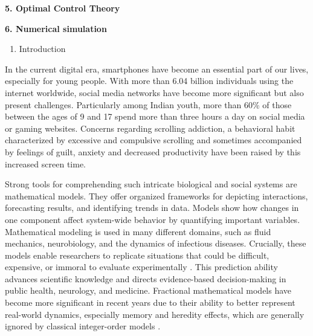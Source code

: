 \documentclass[10pt]{NSP1}
\begin{document}
	\par\medskip\noindent \begin{center}\normalsize\bfseries 5. Optimal Control Theory\end{center}\smallskip
	
	\par\vspace{14.0pt}\noindent \begin{center}\large\bfseries 6. Numerical simulation\end{center}\vspace{14.0pt}
	
	\par\medskip{}\vspace{14.0pt}
	
	\begin{enumerate}
		\item Introduction
	\end{enumerate}
	
	In the current digital era, smartphones have become an essential part of our lives, especially for young people. With more than 6.04 billion individuals using the internet worldwide, social media networks have become more significant but also present challenges. Particularly among Indian youth, more than 60\% of those between the ages of 9 and 17 spend more than three hours a day on social media or gaming websites. Concerns regarding scrolling addiction, a behavioral habit characterized by excessive and compulsive scrolling and sometimes accompanied by feelings of guilt, anxiety and decreased productivity have been raised by this increased \cite{ref1, ref2, ref3, ref4, ref5, ref6, ref7, ref8, ref9, ref10} screen time.
	
	Strong tools for comprehending such intricate biological and social systems are mathematical models. They offer organized frameworks for depicting interactions, forecasting results, and identifying trends in data. Models show how changes in one component affect system-wide behavior by quantifying important variables. Mathematical modeling is used in many different domains, such as fluid mechanics, neurobiology, and the dynamics of infectious diseases. Crucially, these models enable researchers to replicate situations that could be difficult, expensive, or immoral to evaluate experimentally \cite{ref11, ref12, ref13, ref14}. This prediction ability advances scientific knowledge and directs evidence-based decision-making in public health, neurology, and medicine. Fractional mathematical models have become more significant in recent years due to their ability to better represent real-world dynamics, especially memory and heredity effects, which are generally ignored by classical integer-order models \cite{ref8, ref9, ref10, ref11}.
	
\end{document}
